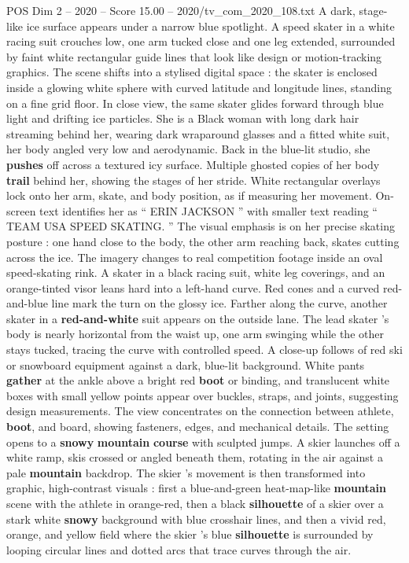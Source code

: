 \begin{textsample}{POS Dim 2 – 2020 – Score 15.00 – 2020/tv\_com\_2020\_108.txt}  \label{ex:f2_pos_049}
A dark, stage-like ice surface appears under a narrow blue spotlight.
A speed skater in a white racing suit crouches low, one arm tucked close and one leg extended, surrounded by faint white rectangular guide lines that look like design or motion-tracking graphics.
The scene shifts into a stylised digital space : the skater is enclosed inside a glowing white sphere with curved latitude and longitude lines, standing on a fine grid floor.
In close view, the same skater glides forward through blue light and drifting ice particles.
She is a Black woman with long dark hair streaming behind her, wearing dark wraparound glasses and a fitted white suit, her body angled very low and aerodynamic.
Back in the blue-lit studio, she \textbf{pushes} off across a textured icy surface.
Multiple ghosted copies of her body \textbf{trail} behind her, showing the stages of her stride.
White rectangular overlays lock onto her arm, skate, and body position, as if measuring her movement.
On-screen text identifies her as “ ERIN JACKSON ” with smaller text reading “ TEAM USA SPEED SKATING. ” The visual emphasis is on her precise skating posture : one hand close to the body, the other arm reaching back, skates cutting across the ice.
The imagery changes to real competition footage inside an oval speed-skating rink.
A skater in a black racing suit, white leg coverings, and an orange-tinted visor leans hard into a left-hand curve.
Red cones and a curved red-and-blue line mark the turn on the glossy ice.
Farther along the curve, another skater in a \textbf{red-and-white} suit appears on the outside lane.
The lead skater ’s body is nearly horizontal from the waist up, one arm swinging while the other stays tucked, tracing the curve with controlled speed.
A close-up follows of red ski or snowboard equipment against a dark, blue-lit background.
White pants \textbf{gather} at the ankle above a bright red \textbf{boot} or binding, and translucent white boxes with small yellow points appear over buckles, straps, and joints, suggesting design measurements.
The view concentrates on the connection between athlete, \textbf{boot}, and board, showing fasteners, edges, and mechanical details.
The setting opens to a \textbf{snowy} \textbf{mountain} \textbf{course} with sculpted jumps.
A skier launches off a white ramp, skis crossed or angled beneath them, rotating in the air against a pale \textbf{mountain} backdrop.
The skier ’s movement is then transformed into graphic, high-contrast visuals : first a blue-and-green heat-map-like \textbf{mountain} scene with the athlete in orange-red, then a black \textbf{silhouette} of a skier over a stark white \textbf{snowy} background with blue crosshair lines, and then a vivid red, orange, and yellow field where the skier ’s blue \textbf{silhouette} is surrounded by looping circular lines and dotted arcs that trace curves through the air.

\end{textsample}
